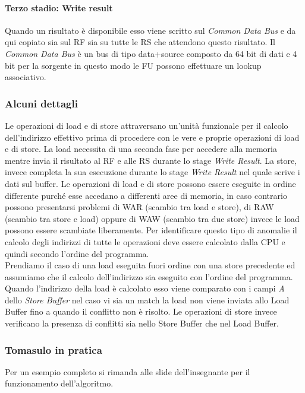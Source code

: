 \paragraph{Terzo stadio: Write result}
Quando un risultato è disponibile esso viene scritto sul \emph{Common Data Bus} e da qui copiato sia sul RF sia su tutte le RS che attendono questo risultato. Il \emph{Common Data Bus} è un bus di tipo data+source composto da 64 bit di dati e 4 bit per la sorgente in questo modo le FU possono effettuare un lookup associativo.
\subsubsection{Alcuni dettagli}
Le operazioni di load e di store attraversano un'unità funzionale per il calcolo dell'indirizzo effettivo prima di procedere con le vere e proprie operazioni di load e di store. La load necessita di una seconda fase per accedere alla memoria mentre invia il risultato al RF e alle RS durante lo stage \emph{Write Result}. La store, invece completa la sua esecuzione durante lo stage \emph{Write Result} nel quale scrive i dati sul buffer.
Le operazioni di load e di store possono essere eseguite in  ordine differente purché esse accedano a differenti aree di memoria, in caso contrario possono presentarsi problemi di WAR (scambio tra load e store), di RAW (scambio tra store e load) oppure di WAW (scambio tra due store) invece le load possono essere scambiate liberamente. Per identificare questo tipo di anomalie il calcolo degli indirizzi di tutte le operazioni deve essere calcolato dalla CPU e quindi secondo l'ordine del programma.\\
Prendiamo il caso di una load eseguita fuori ordine con una store precedente ed assumiamo che il calcolo dell'indirizzo sia eseguito con l'ordine del programma. Quando l'indirizzo della load è calcolato esso viene comparato con i campi \emph{A} dello \emph{Store Buffer} nel caso vi sia un match la load non viene inviata allo Load Buffer fino a quando il conflitto non è risolto. Le operazioni di store invece verificano la presenza di conflitti sia nello Store Buffer che nel Load Buffer.
\subsubsection{Tomasulo in pratica}
Per un esempio completo si rimanda alle slide dell'insegnante per il funzionamento dell'algoritmo.
